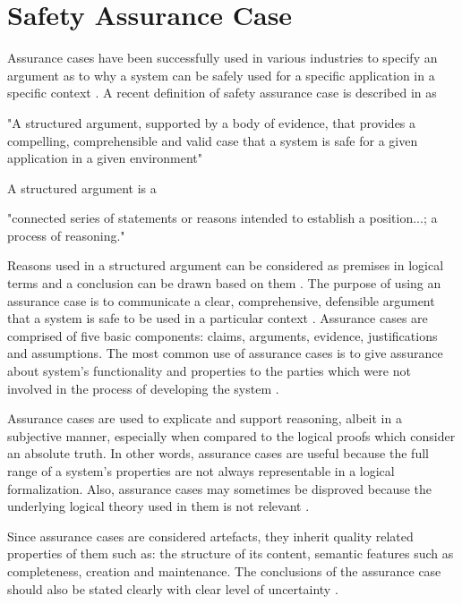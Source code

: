 \section{Safety Assurance Case}
Assurance cases have been successfully used in various industries to specify an argument as to why a system can be safely used for a specific application in a specific context \cite{Ashmore2021}.
A recent definition of safety assurance case is described in \cite{Bloomfield2010} as


\begin{displayquote}[][]
"A structured argument, supported by a body of evidence, that provides a compelling, comprehensible and valid case that a system is safe for a given application in a given environment"
\end{displayquote}
A structured argument is a \cite{Omg2010}
\begin{displayquote}[][]
"connected series of statements or reasons intended to establish a position...; a process of reasoning."
\end{displayquote}
Reasons used in a structured argument can be considered as premises in logical terms and a conclusion can be drawn based on them \cite{Omg2010}.  
The purpose of using an assurance case is to communicate a clear, comprehensive, defensible argument that a system is safe to be used in a particular context \cite{gsn2004Kelly}. Assurance cases are comprised of five basic components: claims, arguments, evidence, justifications and assumptions. The most common use of assurance cases is to give assurance about system's functionality and properties to the parties which were not involved in the process of developing the system \cite{iso15026-1-2019}.

Assurance cases are used to explicate and support reasoning, albeit in a subjective manner, especially when compared to the logical proofs which consider an absolute truth. In other words, assurance cases are useful because the full range of a system's properties are not always representable in a logical formalization. Also, assurance cases may sometimes be disproved because the underlying logical theory used in them is not relevant \cite{iso15026-1-2019}.

Since assurance cases are considered artefacts, they inherit quality related properties of them such as: the structure of its content, semantic features such as completeness, creation and maintenance. The conclusions of the assurance case should also be stated clearly with clear level of uncertainty \cite{iso15026-1-2019}. 

